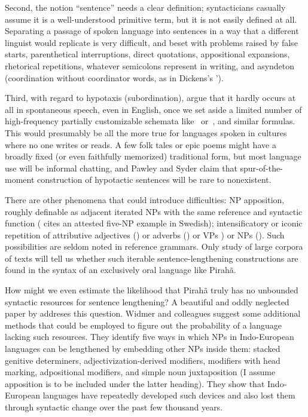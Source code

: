 \documentclass[output=paper,colorlinks,citecolor=brown
]{langscibook}
\begin{document}
Second, the notion ``sentence'' needs a clear definition; syntacticians
casually assume it is a well-understood primitive term, but it is not
easily defined at all. Separating a passage of spoken language into
sentences in a way that a different linguist would replicate is very
difficult, and beset with problems raised by false starts,
parenthetical interruptions, direct quotations, appositional
expansions, rhetorical repetitions, whatever semicolons represent in
writing, and asyndeton (coordination without coordinator words, as
in Dickens's ').

Third, with regard to hypotaxis (subordination), \citet{PawlSyde00}
argue that it hardly occurs at all in spontaneous speech, even in
English, once we set aside a limited number of high-frequency partially
customizable schemata like \, or \,, and similar formulas. This would presumably be all
the more true for languages spoken in cultures where no one writes
or reads. A few folk tales or epic poems might have a broadly fixed
(or even faithfully memorized) traditional form, but most language
use will be informal chatting, and Pawley and Syder claim that
spur-of-the-moment construction of hypotactic sentences will be rare
to nonexistent.

There are other phenomena that could introduce difficulties: NP
apposition, roughly definable as adjacent iterated NPs with the same
reference and syntactic function (\citealt{Karlsson10} cites an
attested five-NP example in Swedish); intensificatory or iconic
repetition of attributive adjectives ()
or adverbs () or VPs ) or NPs (). Such possibilities are seldom noted
in reference grammars. Only study of large corpora of texts will tell
us whether such iterable sentence-lengthening constructions are found
in the syntax of an exclusively oral language like Pirah{\~a}.

How might we even estimate the likelihood that Pirah{\~a} truly has no
unbounded syntactic resources for sentence lengthening? A beautiful
and oddly neglected paper by \citet{WidmerEtAl17} addreses this
question. Widmer and colleagues suggest some additional methods that
could be employed to figure out the probability of a language lacking
such resources. They identify five ways in which NPs in Indo-European
languages can be lengthened by embedding other NPs inside them: stacked
genitive determiners, adjectivization-derived modifiers, modifiers
with head marking, adpositional modifiers, and simple noun
juxtaposition (I assume apposition is to be included under the latter
heading). They show that Indo-European languages have repeatedly
developed such devices and also lost them through syntactic change
over the past few thousand years.
\end{document}

